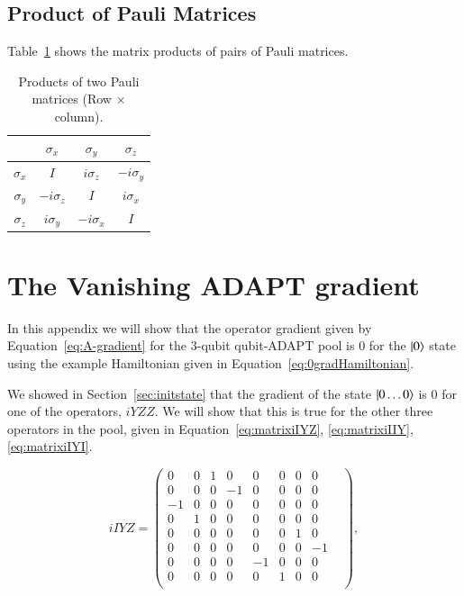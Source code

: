 \section{Product of Pauli Matrices}
Table~\ref{tab:pauli_prod} shows the matrix products of pairs of Pauli matrices.
\begin{table}[ht]
	\centering
	\caption{Products of two Pauli matrices (Row $\times$ column).}
	\label{tab:pauli_prod}

	\begin{tabular}{c c c c}
		\toprule
		 & $ \sigma_x $ & $ \sigma_y $ & $ \sigma_z $ \\
		\midrule
		$\sigma_x $ & $I$ & $i \sigma_z$ & $ -i \sigma_y$ \\
		$\sigma_y$ & $ -i \sigma_z$ & $ I $ & $ i \sigma_x$ \\
		$ \sigma_z$ & $ i \sigma_y$ & $ -i \sigma_x$ & $ I $ \\
		\bottomrule
	\end{tabular}
\end{table}

\chapter{The Vanishing ADAPT gradient}
\label{app:zerograd}

In this appendix we will show that the operator gradient given by Equation~\eqref{eq:A-gradient} for the $ 3 $-qubit qubit-ADAPT pool is $ 0 $ for the $ \ket{0} $ state using the example Hamiltonian given in Equation~\eqref{eq:0gradHamiltonian}. 

We showed in Section~\ref{sec:initstate} that the gradient of the state $ \ket{0\ldots0} $ is $ 0 $ for one of the operators, $ iYZZ $. We will show that this is true for the other three operators in the pool, given in Equation~\eqref{eq:matrixiIYZ}, \eqref{eq:matrixiIIY}, \eqref{eq:matrixiIYI}.

\begin{equation}
	\label{eq:matrixiIYZ}
	iIYZ = \begin{pmatrix} 
	0 & 0 & 1 & 0 & 0 & 0 & 0 & 0 & \\ 
	0 & 0 & 0 & -1 & 0 & 0 & 0 & 0 & \\ 
	-1 & 0 & 0 & 0 & 0 & 0 & 0 & 0 & \\ 
	0 & 1 & 0 & 0 & 0 & 0 & 0 & 0 & \\ 
	0 & 0 & 0 & 0 & 0 & 0 & 1 & 0 & \\ 
	0 & 0 & 0 & 0 & 0 & 0 & 0 & -1 & \\ 
	0 & 0 & 0 & 0 & -1 & 0 & 0 & 0 & \\ 
	0 & 0 & 0 & 0 & 0 & 1 & 0 & 0 & \\   
\end{pmatrix},
\end{equation}

